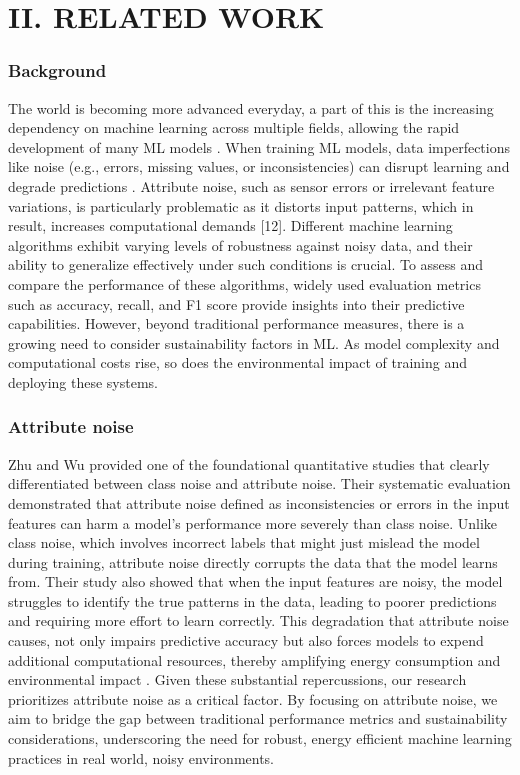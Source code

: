 \documentclass[conference]{IEEEtran}
\begin{document}
\section*{II. RELATED WORK}
\subsubsection*{Background} The world is becoming more advanced everyday, a part of this is the increasing dependency on machine learning across multiple fields, allowing the rapid development of many ML models \cite{bain_ai_sustainability}. When training ML models, data imperfections like noise (e.g., errors, missing values, or inconsistencies) can disrupt learning and degrade predictions \cite{sciencedirect_noise}. Attribute noise, such as sensor errors or irrelevant feature variations, is particularly problematic as it distorts input patterns, which in result, increases computational demands [12]. Different machine learning algorithms exhibit varying levels of robustness against noisy data, and their ability to generalize effectively under such conditions is crucial. To assess and compare the performance of these algorithms, widely used evaluation metrics such as accuracy, recall, and F1 score provide insights into their predictive capabilities. However, beyond traditional performance measures, there is a growing need to consider sustainability factors in ML. As model complexity and computational costs rise, so does the environmental impact of training and deploying these systems. 
\newline
\newline
\subsubsection*{Attribute noise}
Zhu and Wu \cite{wuzu} provided one of the foundational quantitative studies that clearly differentiated between class noise and attribute noise. Their systematic evaluation demonstrated that attribute noise defined as inconsistencies or errors in the input features can harm a model's performance more severely than class noise. Unlike class noise, which involves incorrect labels that might just mislead the model during training, attribute noise directly corrupts the data that the model learns from. Their study also showed that when the input features are noisy, the model struggles to identify the true patterns in the data, leading to poorer predictions and requiring more effort to learn correctly.\newline
\newline
This degradation that attribute noise causes, not only impairs predictive accuracy but also forces models to expend additional computational resources, thereby amplifying energy consumption and environmental impact \cite{wuzu}. Given these substantial repercussions, our research prioritizes attribute noise as a critical factor. By focusing on attribute noise, we aim to bridge the gap between traditional performance metrics and sustainability considerations, underscoring the need for robust, energy efficient machine learning practices in real world, noisy environments.
\end{document}
